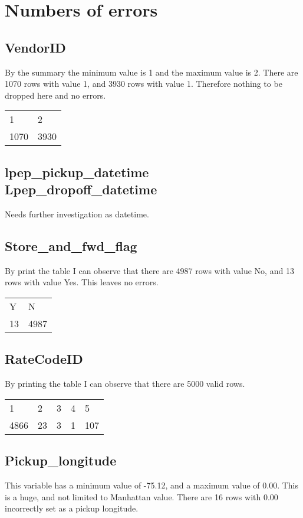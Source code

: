 \documentclass{article}
\begin{document}
\section{Numbers of errors}
\subsection{VendorID}
By the summary the minimum value is 1 and the maximum value is 2. There are 1070 rows with value 1, and 3930 rows with value 1. Therefore nothing to be dropped here and no errors.
\begin{table}[H]
\centering
\begin{tabular}{ll}
1    & 2 \\
1070 & 3930
\end{tabular}
\end{table}

\subsection{lpep\_pickup\_datetime Lpep\_dropoff\_datetime}
Needs further investigation as datetime.

\subsection{Store\_and\_fwd\_flag}
By print the table I can observe that there are 4987 rows with value No, and 13 rows with value Yes. This leaves no errors.
\begin{table}[H]
\centering
\begin{tabular}{ll}
Y    & N  \\
13 & 4987
\end{tabular}
\end{table}

\subsection{RateCodeID}
By printing the table I can observe that there are 5000 valid rows.
\begin{table}[H]
\centering
\begin{tabular}{lllll}
1    & 2  & 3 & 4 & 5   \\
4866 & 23 & 3 & 1 & 107
\end{tabular}
\end{table}

\subsection{Pickup\_longitude}
This variable has a minimum value of -75.12, and a maximum value of 0.00. This is a huge, and not limited to Manhattan value. There are 16 rows with 0.00 incorrectly set as a pickup longitude.
\end{document}
